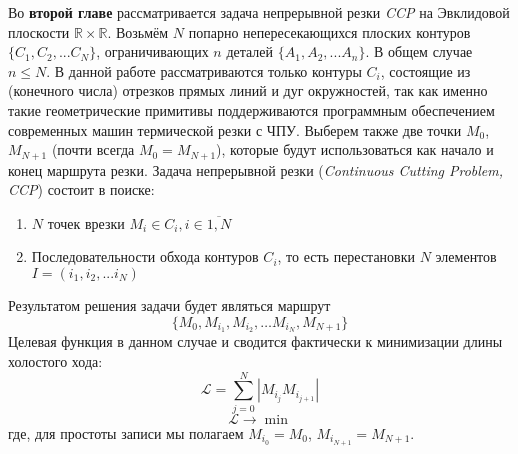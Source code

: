 
Во {\bf второй главе} 
рассматривается задача непрерывной резки {\it CCP}
на Эвклидовой плоскости
$\mathbb R \times \mathbb R$.
Возьмём
$N$
попарно непересекающихся плоских контуров
$\{C_1, C_2, ... C_N\}$,
ограничивающих
$n$
деталей
$\{A_1, A_2, ... A_n\}$.
В общем случае
$n \leqslant N$.
В данной работе рассматриваются только контуры 
$C_i$,
состоящие из
(конечного числа)
отрезков прямых линий и дуг окружностей,
так как именно такие геометрические примитивы
поддерживаются программным обеспечением
современных машин термической резки с ЧПУ.
Выберем также две точки 
$M_0$, $M_{N + 1}$
(почти всегда $M_0 = M_{N + 1}$),
которые будут использоваться
как начало и конец
маршрута резки.
Задача непрерывной резки
({\it Continuous Cutting Problem, CCP})
состоит в поиске:
\begin{enumerate}
\item
$N$ точек врезки $M_i \in C_i, i \in \overline{1, N}$
\item
Последовательности обхода контуров
$C_i$,
то есть перестановки
$N$
элементов
$I = (i_1, i_2, ... i_N)$
\end{enumerate}
Результатом решения задачи будет являться маршрут
\begin{equation}
  \{M_0, M_{i_1}, M_{i_2}, \dots M_{i_N}, M_{N + 1}\}
\end{equation}
Целевая функция в данном случае 
и сводится фактически к минимизации длины холостого хода:
\begin{equation}
  \mathcal{L} = \sum_{j=0}^N|M_{i_j}M_{i_{j+1}}|
  \label{air-move-length}
\end{equation}
$$
\mathcal{L} \to \min
$$
где, для простоты записи мы полагаем
$M_{i_0} = M_0$,
$M_{i_{N + 1}} = M_{N + 1}$.

